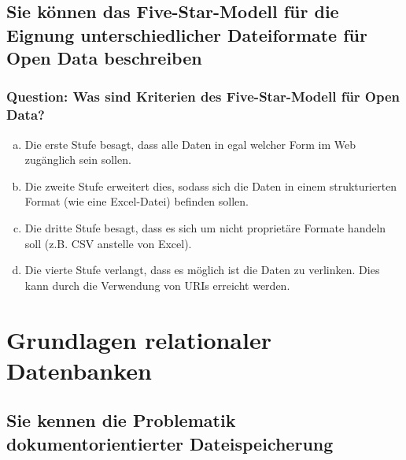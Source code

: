 \documentclass{article}
\begin{document}
\begin{adjustwidth}{2em}{2em}
\begin{adjustwidth}{2em}{2em}
			\subsection{Sie können das Five-Star-Modell für die Eignung unterschiedlicher Dateiformate für Open Data beschreiben}
			\begin{adjustwidth}{1em}{}
				\subsubsection*{Question: Was sind Kriterien des Five-Star-Modell für Open Data?}
				\begin{adjustwidth}{1em}{}
					\begin{enumerate}[(a)]
						\item Die erste Stufe besagt, dass alle Daten in egal welcher Form im Web zugänglich sein sollen.
						\item Die zweite Stufe erweitert dies, sodass sich die Daten in einem strukturierten Format (wie eine Excel-Datei) befinden sollen.
						\item Die dritte Stufe besagt, dass es sich um nicht proprietäre Formate handeln soll (z.B. CSV anstelle von Excel).
						\item Die vierte Stufe verlangt, dass es möglich ist die Daten zu verlinken. Dies kann durch die Verwendung von URIs erreicht werden. 
					\end{enumerate}
				\end{adjustwidth}
			\end{adjustwidth}
		\end{adjustwidth}
			
		\newpage
			
		\section{Grundlagen relationaler Datenbanken}
		\begin{adjustwidth}{2em}{2em}
			\subsection{Sie kennen die Problematik dokumentorientierter Dateispeicherung}
			\begin{adjustwidth}{1em}{}

\end{adjustwidth}
\end{adjustwidth}
\end{adjustwidth}
\end{document}
